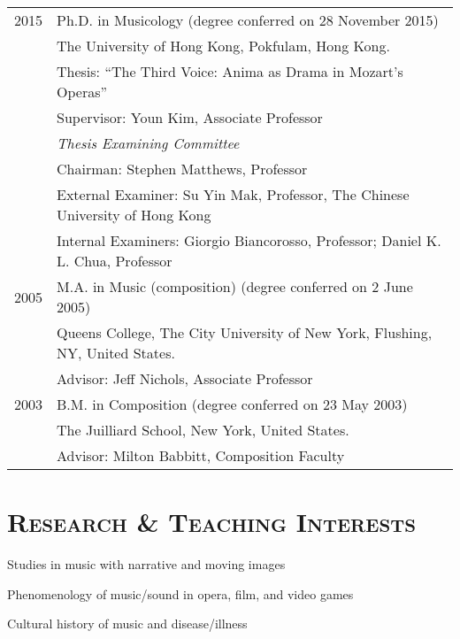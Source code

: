 \documentclass[letter,11pt,draft]{article}
\begin{document}
  \hspace*{-0.25cm}
  \begin{tabular}{p{2.5cm} l}
    2015 & Ph.D. in Musicology (degree conferred on 28 November 2015)\\
    & The University of Hong Kong, Pokfulam, Hong Kong.\\
    & Thesis: ``The Third Voice: Anima as Drama in Mozart's Operas''\\
    & Supervisor: Youn Kim, Associate Professor\\[2mm]
    & \textit{Thesis Examining Committee}\\
    & Chairman: Stephen Matthews, Professor\\
    & External Examiner: Su Yin Mak, Professor, The Chinese University of Hong Kong\\
    & Internal Examiners: Giorgio Biancorosso, Professor; Daniel K. L. Chua, Professor\\[2mm]
    
	2005 & M.A. in Music (composition) (degree conferred on 2 June 2005)\\
    & Queens College, The City University of New York, Flushing, NY, United
    States.\\
	& Advisor: Jeff Nichols, Associate Professor\\[2mm]
    
    2003 & B.M. in Composition (degree conferred on 23 May 2003)\\
    & The Juilliard School, New York, United States.\\
    & Advisor: Milton Babbitt, Composition Faculty
  \end{tabular}
  
  \vspace{5mm}
  
  \section*{\textsc{Research \& Teaching Interests}}
  
  \hspace{2mm} \textbullet \hspace{2mm} Studies in music with narrative and moving images
  
  \noindent \hspace{2mm} \textbullet \hspace{2mm} Phenomenology of music/sound in opera, film, and
  video games
  
  \noindent \hspace{2mm} \textbullet \hspace{2mm} Cultural history of music and
  disease/illness
  
\end{document}
